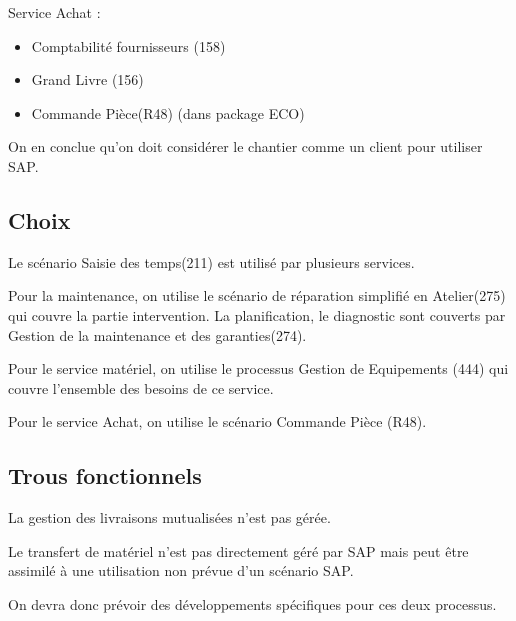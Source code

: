 \documentclass[a4paper]{article}
\begin{document}
Service Achat : \\

\begin{itemize}
    \item Comptabilité fournisseurs (158)
    \item Grand Livre (156)
    \item Commande Pièce(R48) (dans package ECO)
\end{itemize}

On en conclue qu'on doit considérer le chantier comme un client pour utiliser 
SAP.

\subsection{Choix}
Le scénario Saisie des temps(211) est utilisé par plusieurs services.

Pour la maintenance, on utilise le scénario de réparation simplifié en 
Atelier(275) qui couvre la partie intervention.
La planification, le diagnostic sont couverts par Gestion de la maintenance et 
des garanties(274).

Pour le service matériel, on utilise le processus Gestion de Equipements (444) 
qui couvre l'ensemble des besoins de ce service.

Pour le service Achat, on utilise le scénario Commande Pièce (R48). 

\subsection{Trous fonctionnels}

La gestion des livraisons mutualisées n'est pas gérée.

Le transfert de matériel n'est pas directement géré par SAP mais peut être 
assimilé à une utilisation non prévue d'un scénario SAP.

On devra donc prévoir des développements spécifiques pour ces deux processus.

\end{document}
